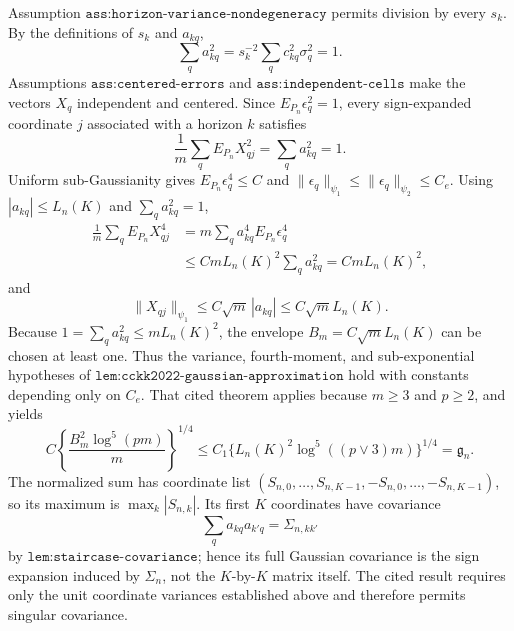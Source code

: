 Assumption \(\texttt{ass:horizon-variance-nondegeneracy}\) permits
division by every \(s_k\).  By the definitions of \(s_k\) and \(a_{kq}\),
\[
 \sum_q a_{kq}^2
 =s_k^{-2}\sum_qc_{kq}^2\sigma_q^2=1.
\]
Assumptions \(\texttt{ass:centered-errors}\) and
\(\texttt{ass:independent-cells}\) make the vectors \(X_q\) independent
and centered.  Since \(E_{P_n}\epsilon_q^2=1\), every sign-expanded
coordinate \(j\) associated with a horizon \(k\) satisfies
\[
 \frac1m\sum_qE_{P_n}X_{qj}^2
 =\sum_q a_{kq}^2=1.
\]
Uniform sub-Gaussianity gives
\(E_{P_n}\epsilon_q^4\le C\) and
\(\|\epsilon_q\|_{\psi_1}\le\|\epsilon_q\|_{\psi_2}\le C_e\).
Using \(|a_{kq}|\le L_n(K)\) and \(\sum_qa_{kq}^2=1\),
\[
 \begin{aligned}
 \frac1m\sum_qE_{P_n}X_{qj}^4
 &=m\sum_qa_{kq}^4E_{P_n}\epsilon_q^4\\
 &\le CmL_n(K)^2\sum_qa_{kq}^2
 =CmL_n(K)^2,
 \end{aligned}
\]
and
\[
 \|X_{qj}\|_{\psi_1}
 \le C\sqrt m\,|a_{kq}|
 \le C\sqrt mL_n(K).
\]
Because \(1=\sum_qa_{kq}^2\le mL_n(K)^2\), the envelope
\(B_m=C\sqrt mL_n(K)\) can be chosen at least one.  Thus the variance,
fourth-moment, and sub-exponential hypotheses of
\(\texttt{lem:cckk2022-gaussian-approximation}\) hold with constants
depending only on \(C_e\).  That cited theorem applies because
\(m\ge3\) and \(p\ge2\), and yields
\[
 C\left\{\frac{B_m^2\log^5(pm)}m\right\}^{1/4}
 \le C_1\{L_n(K)^2\log^5((p\vee3)m)\}^{1/4}
 =\mathfrak g_n.
\]
The normalized sum has coordinate list
\((S_{n,0},\ldots,S_{n,K-1},-S_{n,0},\ldots,-S_{n,K-1})\), so its
maximum is \(\max_k|S_{n,k}|\).  Its first \(K\) coordinates have
covariance
\[
 \sum_q a_{kq}a_{k'q}=\Sigma_{n,kk'}
\]
by \(\texttt{lem:staircase-covariance}\); hence its full Gaussian
covariance is the sign expansion induced by \(\Sigma_n\), not the
\(K\)-by-\(K\) matrix itself.  The cited result requires only the unit
coordinate variances established above and therefore permits singular
covariance.

